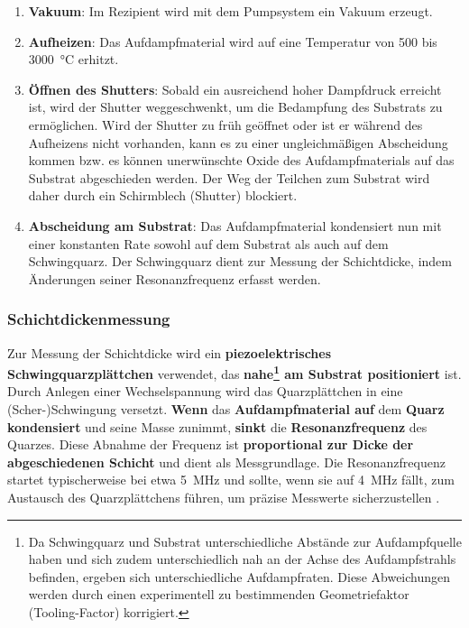 \documentclass{article} %
\begin{document}
\begin{enumerate}
    \item \textbf{Vakuum}: Im Rezipient wird mit dem Pumpsystem ein Vakuum erzeugt.
    \item \textbf{Aufheizen}: Das Aufdampfmaterial wird auf eine Temperatur von 500 bis 3000~°C erhitzt.
    \item \textbf{Öffnen des Shutters}: Sobald ein ausreichend hoher Dampfdruck erreicht ist, wird der Shutter weggeschwenkt, um die Bedampfung 
    des Substrats zu ermöglichen. Wird der Shutter zu früh geöffnet oder ist er während des Aufheizens nicht vorhanden, kann es zu einer 
    ungleichmäßigen Abscheidung kommen bzw. es können unerwünschte Oxide des Aufdampfmaterials auf das Substrat abgeschieden werden. Der Weg der
     Teilchen zum Substrat wird daher durch ein Schirmblech (Shutter) blockiert.
    \item \textbf{Abscheidung am Substrat}: Das Aufdampfmaterial kondensiert nun mit einer konstanten Rate sowohl auf dem Substrat als auch auf 
    dem Schwingquarz. Der Schwingquarz dient zur Messung der Schichtdicke, indem Änderungen seiner Resonanzfrequenz erfasst werden.
\end{enumerate}

\vspace{1em}
\subsubsection{Schichtdickenmessung}
Zur Messung der Schichtdicke wird ein \textbf{piezoelektrisches Schwingquarzplättchen} verwendet, das \textbf{nahe\footnote{Da Schwingquarz und 
Substrat unterschiedliche Abstände zur Aufdampfquelle haben und sich zudem unterschiedlich nah an der Achse des Aufdampfstrahls befinden, 
ergeben sich unterschiedliche Aufdampfraten. Diese Abweichungen werden durch einen experimentell zu bestimmenden Geometriefaktor
(Tooling-Factor) korrigiert.} am Substrat positioniert} ist. Durch Anlegen einer Wechselspannung wird das Quarzplättchen in eine 
(Scher-)Schwingung versetzt. \textbf{Wenn} das \textbf{Aufdampfmaterial auf} dem \textbf{Quarz kondensiert} und seine Masse zunimmt, 
\textbf{sinkt} die \textbf{Resonanzfrequenz} des Quarzes. Diese Abnahme der Frequenz ist \textbf{proportional zur Dicke der abgeschiedenen 
Schicht} und dient als Messgrundlage. Die Resonanzfrequenz startet typischerweise bei etwa 5~MHz und sollte, wenn sie auf 4~MHz fällt, zum 
Austausch des Quarzplättchens führen, um präzise Messwerte sicherzustellen \cite{keplinger2024}.
\end{document}
